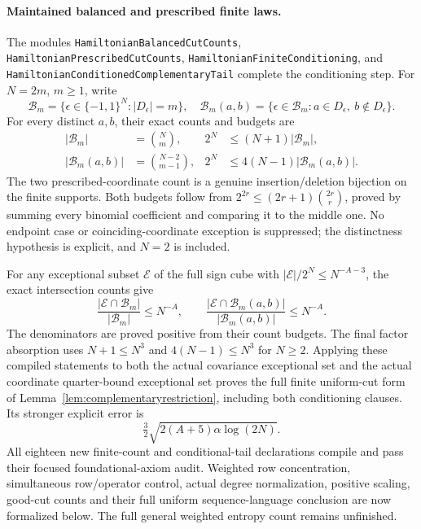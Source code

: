 \paragraph{Maintained balanced and prescribed finite laws.}
The modules \texttt{HamiltonianBalancedCutCounts},
\texttt{HamiltonianPrescribedCutCounts},
\texttt{HamiltonianFiniteConditioning}, and
\texttt{HamiltonianConditionedComplementaryTail} complete
the conditioning step.
For \(N=2m\), \(m\geq1\), write
\[
 \mathcal B_m=\{\epsilon\in\{-1,1\}^N:|D_\epsilon|=m\},
 \quad
 \mathcal B_m(a,b)=\{\epsilon\in\mathcal B_m:
                           a\in D_\epsilon,\ b\notin D_\epsilon\}.
\]
For every distinct \(a,b\), their exact counts and budgets are
\[
 \begin{aligned}
 |\mathcal B_m|&=\binom Nm,&
 2^N&\leq(N+1)|\mathcal B_m|,\\
 |\mathcal B_m(a,b)|&=\binom{N-2}{m-1},&
 2^N&\leq4(N-1)|\mathcal B_m(a,b)|.
 \end{aligned}
\]
The two prescribed-coordinate count is a genuine
insertion/deletion bijection on the finite supports.
Both budgets follow from
\(2^{2r}\leq(2r+1)\binom{2r}{r}\), proved by summing
every binomial coefficient and comparing it to the middle one.
No endpoint case or coinciding-coordinate exception is suppressed;
the distinctness hypothesis is explicit, and \(N=2\) is included.

For any exceptional subset \(\mathcal E\) of the full sign cube
with \(|\mathcal E|/2^N\leq N^{-A-3}\), the exact
intersection counts give
\[
 \frac{|\mathcal E\cap\mathcal B_m|}{|\mathcal B_m|}
       \leq N^{-A},
 \qquad
 \frac{|\mathcal E\cap\mathcal B_m(a,b)|}{|\mathcal B_m(a,b)|}
       \leq N^{-A}.
\]
The denominators are proved positive from their count budgets.
The final factor absorption uses
\(N+1\leq N^3\) and \(4(N-1)\leq N^3\) for \(N\geq2\).
Applying these compiled statements to both the actual
covariance exceptional set and the actual coordinate
quarter-bound exceptional set proves the full finite
uniform-cut form of Lemma~\ref{lem:complementaryrestriction},
including both conditioning clauses.
Its stronger explicit error is
\[
 \tfrac32\sqrt{2(A+5)\alpha\log(2N)}.
\]
All eighteen new finite-count and conditional-tail declarations
compile and pass their focused foundational-axiom audit.
Weighted row concentration, simultaneous row/operator control,
actual degree normalization, positive scaling, good-cut counts
and their full uniform sequence-language conclusion are now
formalized below. The full general weighted entropy count remains
unfinished.

